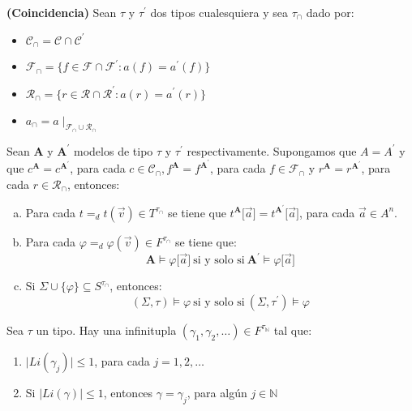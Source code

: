   \begin{lemma} \label{lemma_80}
    \PN \textbf{(Coincidencia)} Sean $\tau$ y $\tau^{\prime}$ dos tipos cualesquiera y sea $\tau_{\cap}$ dado por:
    \begin{itemize}
      \item $\mathcal{C}_{\cap} = \mathcal{C} \cap \mathcal{C}^{\prime}$
      \item $\mathcal{F}_{\cap} = \{f \in \mathcal{F} \cap \mathcal{F}^{\prime}: a(f) = a^{\prime}(f)\}$
      \item $\mathcal{R}_{\cap} = \{r \in \mathcal{R} \cap \mathcal{R}^{\prime}: a(r) = a^{\prime}(r)\}$
      \item $a_{\cap} = a\mid_{\mathcal{F}_{\cap} \cup \mathcal{R}_{\cap}}$
    \end{itemize}

    \PN Sean $\mathbf{A}$ y $\mathbf{A}^{\prime}$ modelos de tipo $\tau$ y $\tau^{\prime}$ respectivamente. Supongamos
    que $A = A^{\prime}$ y que $c^{\mathbf{A}} = c^{\mathbf{A}^{\prime}}$, para cada $c \in \mathcal{C}_{\cap},
    f^{\mathbf{A}} = f^{\mathbf{A}^{\prime}}$, para cada $f \in \mathcal{F}_{\cap}$ y $r^{\mathbf{A}} =
    r^{\mathbf{A}^{\prime}}$, para cada $r \in \mathcal{R}_{\cap}$, entonces:
    \begin{enumerate}[(a)]
      \item Para cada $t =_{d} t(\vec{v}) \in T^{\tau_{\cap}}$ se tiene que $t^{\mathbf{A}} \lbrack \vec{a} \rbrack =
      t^{\mathbf{A}^{\prime}} \lbrack \vec{a} \rbrack$, para cada $\vec{a} \in A^{n}$.
      \item Para cada $\varphi =_{d} \varphi (\vec{v}) \in F^{\tau_{\cap}}$ se tiene que:
      \[
        \mathbf{A} \models \varphi \lbrack \vec{a} \rbrack \ \text{si y solo si} \ \mathbf{A}^{\prime} \models \varphi
        \lbrack \vec{a} \rbrack
      \]
      \item Si $\Sigma \cup \{\varphi\} \subseteq S^{\tau_{\cap}}$, entonces:
      \[
        (\Sigma, \tau) \models \varphi \ \text{si y solo si} \ (\Sigma, \tau^{\prime}) \models \varphi
      \]
    \end{enumerate}
  \end{lemma}

  \begin{lemma} \label{lemma_81}
    \PN Sea $\tau$ un tipo. Hay una infinitupla $(\gamma_{1}, \gamma_{2}, \dotsc) \in F^{\tau_{\mathbb{N}}}$ tal que:
    \begin{enumerate}
      \item $\lvert Li(\gamma_{j}) \rvert \leq 1$, para cada $j = 1, 2, \dotsc$
      \item Si $\lvert Li(\gamma )\rvert \leq 1$, entonces $\gamma = \gamma_{j}$, para algún $j \in \mathbb{N}$
    \end{enumerate}
  \end{lemma}


